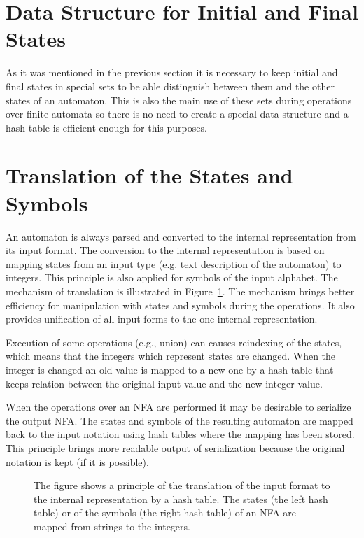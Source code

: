 \section{Data Structure for Initial and Final States}
As it was mentioned in the previous section it is necessary to keep initial and final states in special sets to 
be able distinguish between them and the other states of an automaton. This is also the main use of these sets during operations 
over finite automata so there is no need to create a special data structure and a hash table is efficient enough for this purposes. %

\section{Translation of the States and Symbols}
\label{sectionTranslate}
An automaton is always parsed and converted to the internal representation from its input format. 
The conversion to the internal representation is based on mapping states from an input type (e.g. text description of the automaton) 
to integers. This principle is also applied for symbols of the input alphabet. 
The mechanism of translation is illustrated in Figure~\ref{figExplicitFATransl}. 
The mechanism brings better efficiency for manipulation with states and symbols
during the operations. It also provides unification of all input forms to the one internal representation. 

Execution of some operations (e.g., union) can causes reindexing of the states, which means that the integers 
which represent states are changed. When the integer is changed an old value is mapped to a new one by a hash table that keeps 
relation between the original input value and the new integer value.

When the operations over an NFA are performed it may be desirable to serialize the output NFA. The states and symbols of the resulting
automaton are mapped back to the input notation using hash tables where the mapping has been stored. This
principle brings more readable output of serialization because the original notation is kept (if it is possible).

\begin{figure}[bt]
\begin{center}

    \caption{The figure shows a principle of the translation of the input format to the internal representation by a hash table. 
      The states (the left hash table) or of the symbols (the right hash table) of an NFA are mapped from strings to the integers.}
		\label{figExplicitFATransl}
\end{center}
\end{figure}

